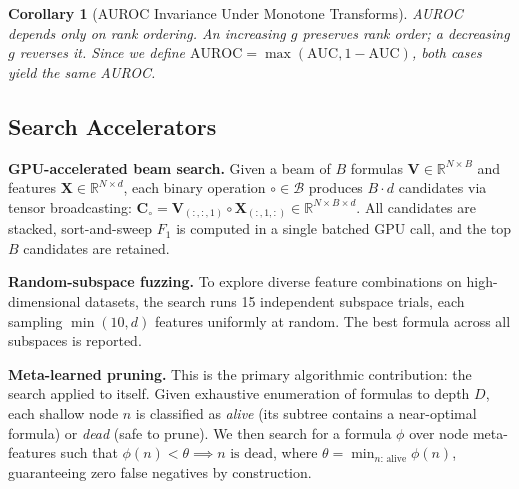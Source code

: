 \documentclass[journal]{IEEEtran}
\newtheorem{corollary}{Corollary}
\begin{document}
\begin{corollary}[AUROC Invariance Under Monotone Transforms]
AUROC depends only on rank ordering.  An increasing $g$ preserves
rank order; a decreasing $g$ reverses it.  Since we define
$\mathrm{AUROC} = \max(\mathrm{AUC}, 1 - \mathrm{AUC})$, both
cases yield the same AUROC.
\end{corollary}

\subsection{Search Accelerators}
\label{sec:search}

\textbf{GPU-accelerated beam search.}
Given a beam of $B$ formulas $\mathbf{V} \in \mathbb{R}^{N \times B}$
and features $\mathbf{X} \in \mathbb{R}^{N \times d}$, each binary
operation $\circ \in \mathcal{B}$ produces $B \cdot d$ candidates via
tensor broadcasting:
$\mathbf{C}_\circ = \mathbf{V}_{(:,:,1)} \circ \mathbf{X}_{(:,1,:)}
\in \mathbb{R}^{N \times B \times d}$.
All candidates are stacked, sort-and-sweep $F_1$ is computed in a
single batched GPU call, and the top $B$ candidates are retained.

\textbf{Random-subspace fuzzing.}
To explore diverse feature combinations on high-dimensional datasets,
the search runs 15 independent subspace trials, each sampling
$\min(10, d)$ features uniformly at random.  The best formula across
all subspaces is reported.

\textbf{Meta-learned pruning.}
This is the primary algorithmic contribution: the search applied to
itself.  Given exhaustive enumeration of formulas to depth $D$, each
shallow node $n$ is classified as \emph{alive} (its subtree contains
a near-optimal formula) or \emph{dead} (safe to prune).  We then
search for a formula $\phi$ over node meta-features such that
$\phi(n) < \theta \implies n \text{ is dead}$, where
$\theta = \min_{n:\,\text{alive}} \phi(n)$, guaranteeing zero false
negatives by construction.
\end{document}
